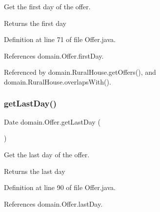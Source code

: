 Get the first day of the offer. 

\begin{DoxyReturn}{Returns}
the first day 
\end{DoxyReturn}


Definition at line 71 of file Offer.\+java.


\begin{DoxyCode}{0}

\end{DoxyCode}


References domain.\+Offer.\+first\+Day.



Referenced by domain.\+Rural\+House.\+get\+Offers(), and domain.\+Rural\+House.\+overlaps\+With().

\mbox{\label{classdomain_1_1Offer_a8bf48365a8fc185dbdcaac80a9d84444}} 
\subsubsection{\texorpdfstring{getLastDay()}{getLastDay()}}
{\footnotesize\ttfamily Date domain.\+Offer.\+get\+Last\+Day (\begin{DoxyParamCaption}{ }\end{DoxyParamCaption})}



Get the last day of the offer. 

\begin{DoxyReturn}{Returns}
the last day 
\end{DoxyReturn}


Definition at line 90 of file Offer.\+java.


\begin{DoxyCode}{0}

\end{DoxyCode}


References domain.\+Offer.\+last\+Day.



